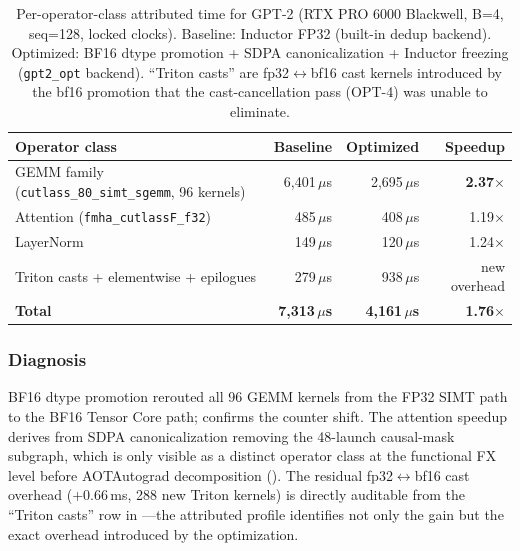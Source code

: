 \begin{table}[h]
\centering
\caption{Per-operator-class attributed time for GPT-2 (RTX PRO 6000 Blackwell, B=4, seq=128,
  locked clocks).  Baseline: Inductor FP32 (built-in dedup backend).  Optimized: BF16 dtype
  promotion + SDPA canonicalization + Inductor freezing (\texttt{gpt2\_opt} backend).
  ``Triton casts'' are fp32$\leftrightarrow$bf16 cast kernels introduced by the bf16 promotion
  that the cast-cancellation pass (OPT-4) was unable to eliminate.}
\label{tab:transformer}
\small
\begin{tabular*}{\textwidth}{@{\extracolsep{\fill}}lrrr}
\toprule
\textbf{Operator class} & \textbf{Baseline} & \textbf{Optimized} & \textbf{Speedup} \\
\midrule
GEMM family (\texttt{cutlass\_80\_simt\_sgemm}, 96 kernels) & 6,401\,$\mu$s & 2,695\,$\mu$s & \textbf{2.37$\times$} \\
Attention (\texttt{fmha\_cutlassF\_f32})                    &   485\,$\mu$s &   408\,$\mu$s & 1.19$\times$ \\
LayerNorm                                                   &   149\,$\mu$s &   120\,$\mu$s & 1.24$\times$ \\
Triton casts + elementwise + epilogues                      &   279\,$\mu$s &   938\,$\mu$s & new overhead \\
\midrule
\textbf{Total}                                              & \textbf{7,313\,$\mu$s} & \textbf{4,161\,$\mu$s} & \textbf{1.76$\times$} \\
\bottomrule
\end{tabular*}
\end{table}




\subsubsection*{Diagnosis}

BF16 dtype promotion rerouted all 96 GEMM kernels from the FP32 SIMT path to the BF16
Tensor Core path;  confirms the counter shift.  The attention
speedup derives from SDPA canonicalization removing the 48-launch causal-mask subgraph,
which is only visible as a distinct operator class at the functional FX level before
AOTAutograd decomposition ().  The residual
fp32$\leftrightarrow$bf16 cast overhead (+0.66\,ms, 288 new Triton kernels) is directly
auditable from the ``Triton casts'' row in ---the attributed
profile identifies not only the gain but the exact overhead introduced by the optimization.

